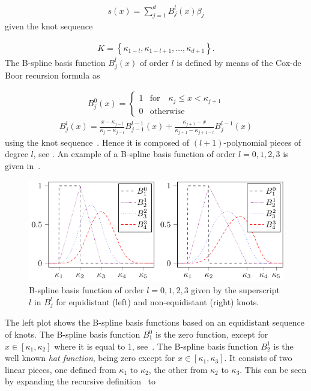 \begin{align}
	s(x) = \sum_{j=1}^d B_j^l(x) \beta_j 
\end{align}
%
given the knot sequence 

\begin{align} \label{eq:knot-sequence}
	K = \left\{\kappa_{1-l}, \kappa_{1-l+1}, \dots, \kappa_{d+1}\right\}.
\end{align}
%
The B-spline basis function $B_j^l(x)$ of order $l$ is defined by means of the Cox-de Boor recursion formula as

\begin{align} \label{eq:Bspline_recDef1}
	B_j^0(x) = \begin{cases} 1 & \text{for} \quad \kappa_j \le x < \kappa_{j+1} \\ 
					 		 0 & \text{otherwise} 
	\end{cases}
\end{align}
\begin{align} \label{eq:Bspline_recDef2}
	B_j^l(x) = \frac{x - \kappa_{j-l}}{\kappa_{j} - \kappa_{j-l}} B_{j-1}^{l-1}(x) + \frac{\kappa_{j+1} - x}{\kappa_{j+1} - \kappa_{j+1-l}} B_{j}^{l-1}(x)
\end{align}
%
using the knot sequence~. Hence it is composed of $(l+1)$-polynomial pieces of degree $l$, see \cite{fahrmeir2007regression}. An example of a B-spline basis function of order $l=0, 1, 2, 3$ is given in~. 

\begin{figure}[H]
	\centering
	\includegraphics{graphics/pgfplots/cha2/spline-types.pdf}
	\caption{B-spline basis function of order $l=0, 1, 2, 3$ given by the superscript $l$ in $B_j^l$ for equidistant (left) and non-equidistant (right) knots.}
	\label{fig:spline-types-both}
\end{figure}

The left plot shows the B-spline basis functions based on an equidistant sequence of knots. The B-spline basis function $B_1^0$ is the zero function, except for $x \in [\kappa_1, \kappa_2]$ where it is equal to 1, see~. The B-spline basis function $B_2^1$ is the well known \emph{hat function}, being zero except for $x \in [\kappa_1, \kappa_3]$. It consists of two linear pieces, one defined from $\kappa_1$ to $\kappa_2$, the other from $\kappa_2$ to $\kappa_3$. This can be seen by expanding the recursive definition~ to

